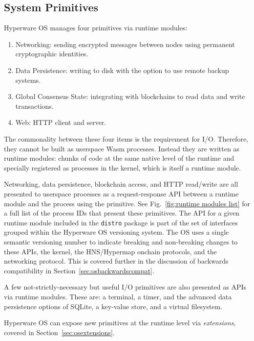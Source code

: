 \documentclass[runningheads]{llncs}
\begin{document}
\newpage
\subsection{System Primitives}
\label{sec:osprimitives}

Hyperware OS manages four primitives via runtime modules:

\begin{enumerate}
    \item Networking: sending encrypted messages between nodes using permanent cryptographic identities.
    \item Data Persistence: writing to disk with the option to use remote backup systems.
    \item Global Consensus State: integrating with blockchains to read data and write transactions.
    \item Web: HTTP client and server.
\end{enumerate}

The commonality between these four items is the requirement for I/O.
Therefore, they cannot be built as userspace Wasm processes.
Instead they are written as runtime modules: chunks of code at the same native level of the runtime and specially registered as processes in the kernel, which is itself a runtime module.

Networking, data persistence, blockchain access, and HTTP read/write are all presented to userspace processes as a request-response API between a runtime module and the process using the primitive.
See Fig.~\ref{fig:runtime modules list} for a full list of the process IDs that present these primitives.
The API for a given runtime module included in the \verb|distro| package is part of the set of interfaces grouped within the Hyperware OS versioning system.
The OS uses a single semantic versioning number to indicate breaking and non-breaking changes to these APIs, the kernel, the HNS/Hypermap onchain protocols, and the networking protocol.
This is covered further in the discussion of backwards compatibility in Section~\ref{sec:osbackwardscompat}.

A few not-strictly-necessary but useful I/O primitives are also presented as APIs via runtime modules.
These are: a terminal, a timer, and the advanced data persistence options of SQLite, a key-value store, and a virtual filesystem.

Hyperware OS can expose new primitives at the runtime level via \textit{extensions}, covered in Section~\ref{sec:osextensions}.
\end{document}
